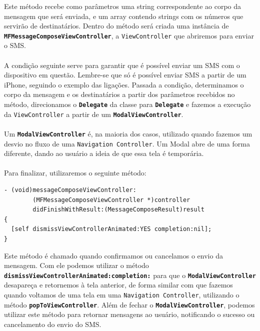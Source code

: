 \documentclass[a4paper,12pt,brazil,doubleside]{book}
\begin{document}
Este método recebe como parâmetros uma string correspondente ao corpo da mensagem que será enviada, e um array contendo strings com os números que servirão de destinatários. Dentro do método será criada uma instância de \texttt{\textbf{MFMessageComposeViewController}}, a \texttt{ViewController} que abriremos para enviar o SMS.
\paragraph{}A condição seguinte serve para garantir que é possível enviar um SMS com o dispositivo em questão. Lembre-se que só é possível enviar SMS a partir de um iPhone, seguindo o exemplo das ligações. Passada a condição, determinamos o corpo da mensagem e os destinatários a partir dos parâmetros recebidos no método, direcionamos o \texttt{\textbf{Delegate}} da classe para \texttt{\textbf{Delegate}} e fazemos a execução da \texttt{ViewController} a partir de um \texttt{\textbf{ModalViewController}}.
\paragraph{}Um \texttt{\textbf{ModalViewController}} é, na maioria dos casos, utilizado quando fazemos um desvio no fluxo de uma \texttt{Navigation Controller}. Um Modal abre de uma forma diferente, dando ao usuário a ideia de que essa tela é temporária.
\paragraph{}Para finalizar, utilizaremos o seguinte método:

\begin{listing}
\begin{verbatim}
- (void)messageComposeViewController:
        (MFMessageComposeViewController *)controller
        didFinishWithResult:(MessageComposeResult)result
{
  [self dismissViewControllerAnimated:YES completion:nil];  
}
\end{verbatim}
\end{listing}

Este método é chamado quando confirmamos ou cancelamos o envio da mensagem. Com ele podemos utilizar o método \texttt{\textbf{dismissViewControllerAnimated:completion:}} para que o \texttt{\textbf{ModalViewController}} desapareça e retornemos à tela anterior, de forma similar com que fazemos quando voltamos de uma tela em uma \texttt{Navigation Controller}, utilizando o método \texttt{\textbf{popToViewController}}. Além de fechar o \texttt{\textbf{ModalViewController}}, podemos utilizar este método para retornar mensagens ao usuário, notificando o sucesso ou cancelamento do envio do SMS.
\end{document}

